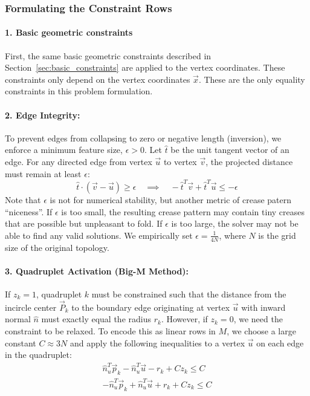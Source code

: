 \documentclass[11pt]{article}
\begin{document}
\subsubsection{Formulating the Constraint Rows}

\paragraph{1. Basic geometric constraints}
First, the same basic geometric constraints described in Section~\ref{sec:basic_constraints} are applied to the vertex coordinates. These constraints only depend on the vertex coordinates $\vec{x}$. These are the only equality constraints in this problem formulation.

\paragraph{2. Edge Integrity:}
To prevent edges from collapsing to zero or negative length (inversion), we enforce a minimum feature size, $\epsilon>0$. Let $\hat{t}$ be the unit tangent vector of an edge. For any directed edge from vertex $\vec{u}$ to vertex $\vec{v}$, the projected distance must remain at least $\epsilon$:
\begin{equation}
    \hat{t} \cdot (\vec{v}-\vec{u}) \ge \epsilon \quad \implies \quad - \hat{t}^T \vec{v} + \hat{t}^T \vec{u} \le -\epsilon
\end{equation}
Note that $\epsilon$ is not for numerical stability, but another metric of crease patern ``niceness''. If $\epsilon$ is too small, the resulting crease pattern may contain tiny creases that are possible but unpleasant to fold. If $\epsilon$ is too large, the solver may not be able to find any valid solutions. We empirically set $\epsilon = \frac{1}{4N}$, where $N$ is the grid size of the original topology.

\paragraph{3. Quadruplet Activation (Big-M Method):}
If $z_k = 1$, quadruplet $k$ must be constrained such that the distance from the incircle center $\vec{P}_k$ to the boundary edge originating at vertex $\vec{u}$ with inward normal $\hat{n}$ must exactly equal the radius $r_k$. However, if $z_k = 0$, we need the constraint to be relaxed. To encode this as linear rows in $M$, we choose a large constant $C\approx 3N$ and apply the following inequalities to a vertex $\vec{u}$ on each edge in the quadruplet:
\begin{align}
    \hat{n}_u^T \vec{p}_k - \hat{n}_u^T \vec{u} - r_k + C z_k \le C \\
    -\hat{n}_u^T \vec{p}_k + \hat{n}_u^T \vec{u} + r_k + C z_k \le C
\end{align}
\end{document}
